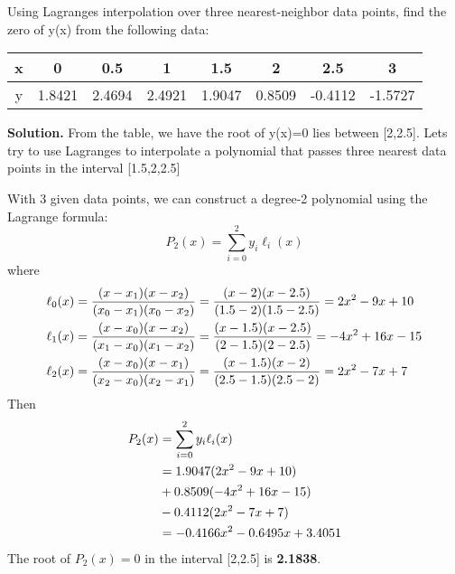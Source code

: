 \begin{exercise}{3} %
Using Lagrange\textquotesingle s interpolation over three nearest-neighbor data points, find the zero of y(x) from the following data:
\begin{table}[h]
\centering
\begin{tabular}{|c|c|c|c|c|c|c|c|}
\hline
x & 0 & 0.5 & 1& 1.5& 2& 2.5& 3 \\ \hline
y & 1.8421& 2.4694 &2.4921& 1.9047& 0.8509 &-0.4112 &-1.5727 \\ \hline
\end{tabular}
\end{table}

\textbf{Solution.}
From the table, we have the root of y(x)=0 lies between [2,2.5].
Let\textquotesingle s try to use Lagrange\textquotesingle s to interpolate a polynomial that passes three nearest data points in the interval [1.5,2,2.5]

With 3 given data points, we can construct a degree-2 polynomial using the Lagrange formula:\\
$$P_{2}(x)=\sum_{i=0}^2 y_{i}\ell_{i}(x)$$
where
\begin{align}
\ell_{0}(x)&=\frac{(x-x_1)(x-x_2)}{(x_0-x_1)(x_0-x_2)}=\frac{(x-2)(x-2.5)}{(1.5-2)(1.5-2.5)} = 2x^2-9x+10 \notag\\
\ell_{1}(x)&=\frac{(x-x_0)(x-x_2)}{(x_1-x_0)(x_1-x_2)}=\frac{(x-1.5)(x-2.5)}{(2-1.5)(2-2.5)}= -4x^2 + 16x - 15 \notag\\
\notag 
\ell_{2}(x)&=\frac{(x-x_0)(x-x_1)}{(x_2-x_0)(x_2-x_1)}=\frac{(x-1.5)(x-2)}{(2.5-1.5)(2.5-2)} = 2x^2-7x + 7
\end{align}
Then
\begin{align}
P_{2}(x)&=\sum_{i=0}^2 y_{i}\ell_{i}(x) \notag \\
&= 1.9047(2x^2-9x+10) \notag \\
&+ 0.8509(-4x^2 + 16x - 15) \notag \\
&-0.4112(2x^2-7x + 7) \notag \\
&=-0.4166x^2-0.6495x+3.4051 \notag
\end{align}
The root of $P_2(x) = 0$ in the interval [2,2.5] is \textbf{2.1838}.

\end{exercise}


